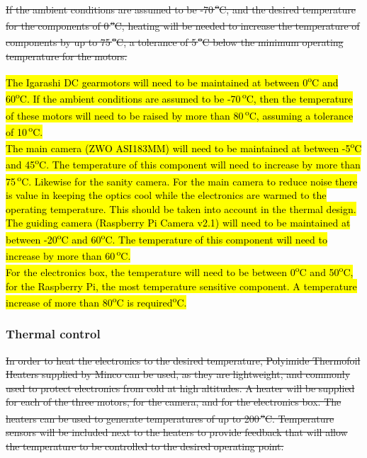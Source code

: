 \st{If the ambient conditions are assumed to be -70\,\textsuperscript{o}C, and the desired temperature for the components of 0\,\textsuperscript{o}C, heating will be needed to increase the temperature of components by up to  75\,\textsuperscript{o}C, a tolerance of 5\,\textsuperscript{o}C below the minimum operating temperature for the motors.\\} 

\hl{The Igarashi DC gearmotors will need to be maintained at between 0\textsuperscript{o}C and 60\textsuperscript{o}C. If the ambient conditions are assumed to be -70\,\textsuperscript{o}C, then the temperature of these motors will need to be raised by more than 80\,\textsuperscript{o}C, assuming a tolerance of 10\,\textsuperscript{o}C.\\

The main camera (ZWO ASI183MM) will need to be maintained at between -5\textsuperscript{o}C and 45\textsuperscript{o}C. The temperature of this component will need to increase by more than 75\,\textsuperscript{o}C. Likewise for the sanity camera. For the main camera to reduce noise there is value in keeping the optics cool while the electronics are warmed to the operating temperature. This should be taken into account in the thermal design.\\

The guiding camera (Raspberry Pi Camera v2.1) will need to be maintained at between -20\textsuperscript{o}C and 60\textsuperscript{o}C. The temperature of this component will need to increase by more than 60\,\textsuperscript{o}C.\\

For the electronics box, the temperature will need to be between 0\textsuperscript{o}C and 50\textsuperscript{o}C, for the Raspberry Pi, the most temperature sensitive component. A temperature increase of more than 80\textsuperscript{o}C is required\textsuperscript{o}C.\\}

\subsubsection{Thermal control}
\st{In order to heat the electronics to the desired temperature, Polyimide Thermofoil Heaters supplied by Minco can be used, as they are lightweight, and commonly used to protect electronics from cold at high altitudes. A heater will be supplied for each of the three motors, for the camera, and for the electronics box. The heaters can be used to generate temperatures of up to 200\,\textsuperscript{o}C. Temperature sensors will be included next to the heaters to provide feedback that will allow the temperature to be controlled to the desired operating point.} \\


